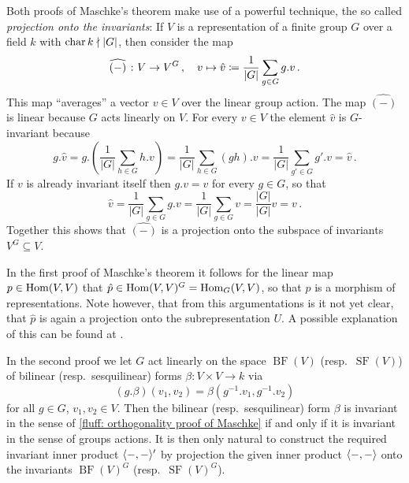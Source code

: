 \begin{remark}
  \label{remark: projection onto invariants}
  Both proofs of Maschke’s theorem make use of a powerful technique, the so called \emph{projection onto the invariants}:
  If $V$ is a representation of a finite group $G$ over a field $k$ with $\operatorname{char} k \nmid |G|$, then consider the map
  \[
              \widehat{(-)} \;
    \colon    V
    \to       V^G \,,
    \quad     v
    \mapsto   \hat{v}
    \coloneqq  \frac{1}{|G|} \sum_{g \in G} g.v \,.
  \]
  This map “averages” a vector $v \in V$ over the linear group action.
  The map $\widehat{(-)}$ is linear because $G$ acts linearly on $V$.
  For every $v \in V$ the element $\hat{v}$ is $G$-invariant because
  \[
      g.\hat{v}
    = g.\left( \frac{1}{|G|} \sum_{h \in G} h.v \right)
    = \frac{1}{|G|} \sum_{h \in G} (gh).v
    = \frac{1}{|G|} \sum_{g' \in G} g'.v
    = \hat{v} \,.
  \]
  If $v$ is already invariant itself then $g.v = v$ for every $g \in G$, so that
  \[
      \hat{v}
    = \frac{1}{|G|} \sum_{g \in G} g.v
    = \frac{1}{|G|} \sum_{g \in G} v
    = \frac{|G|}{|G|} v
    = v \,.
  \]
  Together this shows that $\widehat{(-)}$ is a projection onto the subspace of invariants $V^G \subseteq V$.
  
  In the first proof of Maschke’s theorem it follows for the linear map $p \in \operatorname{Hom}(V,V)$ that $\hat{p} \in \operatorname{Hom}(V,V)^G = \operatorname{Hom}_G(V,V)$, so that $\hat{p}$ is a morphism of representations.
  Note however, that from this argumentations is it not yet clear, that $\hat{p}$ is again a projection onto the subrepresentation $U$.
  A possible explanation of this can be found at \cite{MS2644102}.
  
  In the second proof we let $G$ act linearly on the space $\operatorname{BF}(V)$ (resp.\ $\operatorname{SF}(V)$) of bilinear (resp.\ sesquilinear) forms $\beta \colon V \times V \to k$ via
  \[
      (g.\beta)(v_1, v_2)
    = \beta\left( g^{-1}.v_1, g^{-1}.v_2 \right)
  \]
  for all $g \in G$, $v_1, v_2 \in V$.
  Then the bilinear (resp.\ sesquilinear) form $\beta$ is invariant in the sense of \ref{fluff: orthogonality proof of Maschke} if and only if it is invariant in the sense of groups actions.
  It is then only natural to construct the required invariant inner product $\langle -,- \rangle'$ by projection the given inner product $\langle -,- \rangle$ onto the invariants $\operatorname{BF}(V)^G$ (resp.\ $\operatorname{SF}(V)^G$).
\end{remark}





